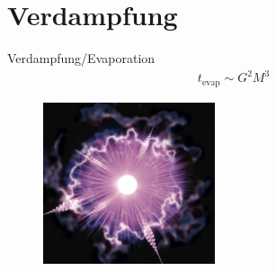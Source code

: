 \documentclass[ngerman,ph]{URbeamer}
\begin{document}
	\section{Verdampfung}
	\begin{frame}{Verdampfung/Evaporation}
		\begin{align*}
		t_{\text{evap}} \sim G^2 M^3
		\end{align*} 
		\begin{figure} [h] 
			\begin{center}
				\includegraphics[width=0.45\textwidth]{evaporation}
			\end{center}
		\end{figure}
	\end{frame}
	
\end{document}
